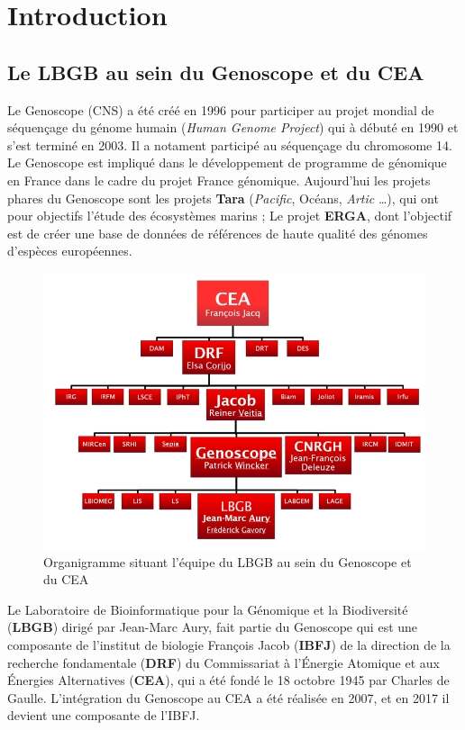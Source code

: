 \section{Introduction}
\subsection{Le LBGB au sein du Genoscope et du CEA}
Le Genoscope (CNS) a été créé en 1996 pour participer au projet mondial de séquençage du génome humain (\emph{Human Genome Project}) qui à débuté en 1990 et s'est terminé en 2003. Il a notament participé au séquençage du chromosome 14. Le Genoscope est impliqué dans le développement de programme de génomique en France dans le cadre du projet France génomique. Aujourd'hui les projets phares du Genoscope sont les projets \textbf{Tara} (\emph{Pacific}, Océans, \emph{Artic} \dots), qui ont pour objectifs l'étude des écosystèmes marins ; Le projet \textbf{ERGA}, dont l'objectif est de créer une base de données de références de haute qualité des génomes d'espèces européennes.

\begin{minipage}{0.45\textwidth}
\begin{figure}[H]
    \includegraphics[width=1.1\textwidth]{img/organigramme.png}
    \caption{Organigramme situant l’équipe du LBGB au sein du Genoscope et du CEA}
    \label{organigramme_LBGB}
\end{figure}
\end{minipage} 
\hfill
\begin{minipage}{0.45\textwidth}
    Le Laboratoire de Bioinformatique pour la Génomique et la Biodiversité (\textbf{LBGB}) dirigé par Jean-Marc Aury, fait partie du Genoscope qui est une composante de l'institut de biologie François Jacob (\textbf{IBFJ}) de la direction de la recherche fondamentale (\textbf{DRF}) du Commissariat à l'Énergie Atomique et aux Énergies Alternatives (\textbf{CEA}), qui a été fondé le 18 octobre 1945 par Charles de Gaulle. L'intégration du Genoscope au CEA a été réalisée en 2007, et en 2017 il devient une composante de l'IBFJ.
\end{minipage}

